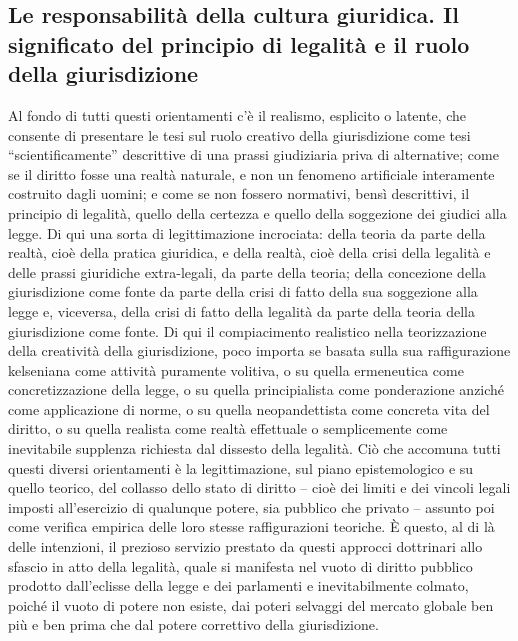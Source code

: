 \subsection{Le responsabilità della cultura giuridica. Il significato del principio di legalità e il ruolo della giurisdizione} %
Al fondo di tutti questi orientamenti c’è il realismo, esplicito o latente, che consente di presentare le tesi sul ruolo creativo della giurisdizione come tesi “scientificamente” descrittive di una prassi giudiziaria priva di alternative; come se il diritto fosse una realtà naturale, e non un fenomeno artificiale interamente costruito dagli uomini; e come se non fossero normativi, bensì descrittivi, il principio di legalità, quello della certezza e quello della soggezione dei giudici alla legge. Di qui una sorta di legittimazione incrociata: della teoria da parte della realtà, cioè della pratica giuridica, e della realtà, cioè della crisi della legalità e delle prassi giuridiche extra-legali, da parte della teoria; della concezione della giurisdizione come fonte da parte della crisi di fatto della sua soggezione alla legge e, viceversa, della crisi di fatto della legalità da parte della teoria della giurisdizione come fonte. Di qui il compiacimento realistico nella teorizzazione della creatività della giurisdizione, poco importa se basata sulla sua raffigurazione kelseniana come attività puramente volitiva, o su quella ermeneutica come concretizzazione della legge, o su quella principialista come ponderazione anziché come applicazione di norme, o su quella neopandettista come concreta vita del diritto, o su quella realista come realtà effettuale o semplicemente come inevitabile supplenza richiesta dal dissesto della legalità. Ciò che accomuna tutti questi diversi orientamenti è la legittimazione, sul piano epistemologico e su quello teorico, del collasso dello stato di diritto – cioè dei limiti e dei vincoli legali imposti all’esercizio di qualunque potere, sia pubblico che privato – assunto poi come verifica empirica delle loro stesse raffigurazioni teoriche. È questo, al di là delle intenzioni, il prezioso servizio prestato da questi approcci dottrinari allo sfascio in atto della legalità, quale si manifesta nel vuoto di diritto pubblico prodotto dall’eclisse della legge e dei parlamenti e inevitabilmente colmato, poiché il vuoto di potere non esiste, dai poteri selvaggi del mercato globale ben più e ben prima che dal potere correttivo della giurisdizione.
